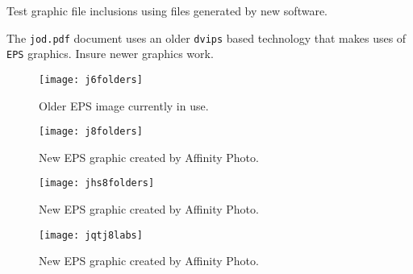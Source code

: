 %
%
%




Test graphic file inclusions using files generated by new software.

The \texttt{jod.pdf} document uses an older \texttt{dvips} based technology
that makes uses of \texttt{EPS} graphics.  Insure newer graphics work.


\begin{figure}
\centering
 \texttt{[image: j6folders]}
 \caption{Older EPS image currently in use.}
\end{figure}


\begin{figure}
  \centering
  \texttt{[image: j8folders]}
  \caption{New EPS graphic created by Affinity Photo.}
\end{figure}


\begin{figure}
  \centering
  \texttt{[image: jhs8folders]}
  \caption{New EPS graphic created by Affinity Photo.}
\end{figure}

\begin{figure}
  \centering
  \texttt{[image: jqtj8labs]}
  \caption{New EPS graphic created by Affinity Photo.}
\end{figure}
  


